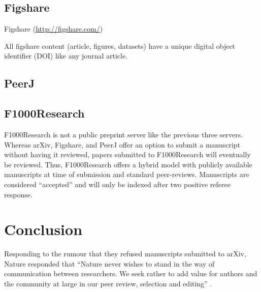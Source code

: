\documentclass[letterpaper,twocolumn,superscriptaddress,showkeys]{revtex4}
\begin{document}
\subsection{Figshare}


Figshare (\href{http://figshare.com/}{http://figshare.com/})

All figshare content (article, figures, datasets) have a unique digital object
identifier (DOI) like any journal article.

\subsection{PeerJ}


\subsection{F1000Research}


F1000Research is not a public preprint server like the previous three servers.
Whereas arXiv, Figshare, and PeerJ offer an option to submit a manuscript
without having it reviewed, papers submitted to F1000Research will eventually be
reviewed. Thus, F1000Research offers a hybrid model with publicly available
manuscripts at time of submission and standard peer-reviews. Manuscripts are
considered ``accepted'' and will only be indexed after two positive referee
response.

\section{Conclusion}


Responding to the rumour that they refused manuscripts submitted to arXiv,
Nature responded that ``Nature never wishes to stand in the way of communication
between researchers. We seek rather to add value for authors and the community
at large in our peer review, selection and editing'' \cite{nat05}.

\newpage


\end{document}
